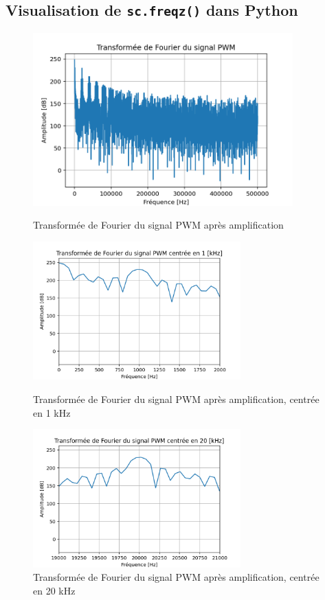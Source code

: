 \documentclass[a4paper,12pt,oneside]{report}	%
\begin{document}
        \subsection{Visualisation de \texttt{sc.freqz()} dans Python}
            \begin{figure}[h!]
                \centering
                \includegraphics[width = 10cm]{images/1.3.2 - Fourier transform of ampl_PWM.png}
                \caption{Transformée de Fourier du signal PWM après amplification}
                \label{fig:fourier_PWM_amp}
                
                \includegraphics[width = 8cm]{images/1.3.2 - Fourier transform of ampl_PWM centered on 1000 Hz.png}
                \caption{Transformée de Fourier du signal PWM après amplification, centrée en 1 kHz}
                \label{fig:fourier_PWM_amp_1kHz}
                
                \includegraphics[width = 8cm]{images/1.3.2 - Fourier transform of ampl_PWM centered on 20 000 Hz.png}
                \caption{Transformée de Fourier du signal PWM après amplification, centrée en 20 kHz}
                \label{fig:fourier_PWM_amp_20kHz}
            \end{figure}
\end{document}
